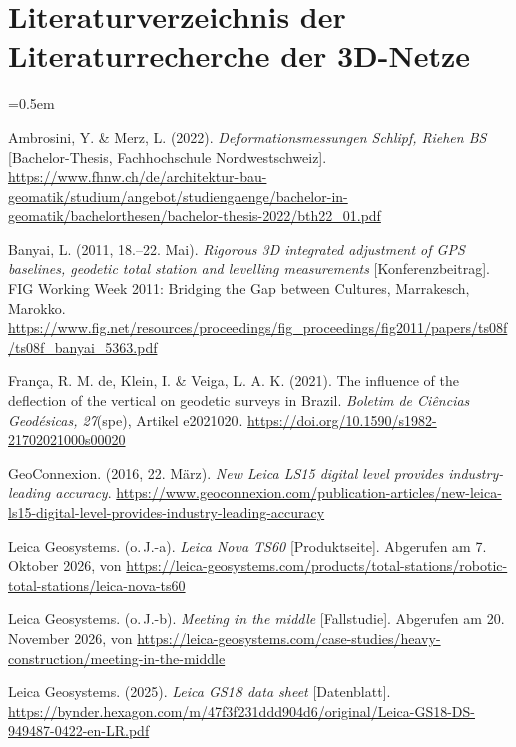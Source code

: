 \section{Literaturverzeichnis der Literaturrecherche der 3D-Netze}
\label{Literaturverzeichnis der Literaturrecherche}

\begin{list}{}{\leftmargin=1.27cm \itemindent=-1.27cm \itemsep=0.5em}

\item Ambrosini, Y. \& Merz, L. (2022). \textit{Deformationsmessungen Schlipf, Riehen BS} [Bachelor-Thesis, Fachhochschule Nordwestschweiz]. \url{https://www.fhnw.ch/de/architektur-bau-geomatik/studium/angebot/studiengaenge/bachelor-in-geomatik/bachelorthesen/bachelor-thesis-2022/bth22_01.pdf}

\item Banyai, L. (2011, 18.--22. Mai). \textit{Rigorous 3D integrated adjustment of GPS baselines, geodetic total station and levelling measurements} [Konferenzbeitrag]. FIG Working Week 2011: Bridging the Gap between Cultures, Marrakesch, Marokko. \url{https://www.fig.net/resources/proceedings/fig_proceedings/fig2011/papers/ts08f/ts08f_banyai_5363.pdf}

\item França, R. M. de, Klein, I. \& Veiga, L. A. K. (2021). The influence of the deflection of the vertical on geodetic surveys in Brazil. \textit{Boletim de Ciências Geodésicas, 27}(spe), Artikel e2021020. \url{https://doi.org/10.1590/s1982-21702021000s00020}

\item GeoConnexion. (2016, 22. März). \textit{New Leica LS15 digital level provides industry-leading accuracy}. \url{https://www.geoconnexion.com/publication-articles/new-leica-ls15-digital-level-provides-industry-leading-accuracy}

\item Leica Geosystems. (o.\,J.-a). \textit{Leica Nova TS60} [Produktseite]. Abgerufen am 7. Oktober 2026, von \url{https://leica-geosystems.com/products/total-stations/robotic-total-stations/leica-nova-ts60}

\item Leica Geosystems. (o.\,J.-b). \textit{Meeting in the middle} [Fallstudie]. Abgerufen am 20. November 2026, von \url{https://leica-geosystems.com/case-studies/heavy-construction/meeting-in-the-middle}

\item Leica Geosystems. (2025). \textit{Leica GS18 data sheet} [Datenblatt]. \url{https://bynder.hexagon.com/m/47f3f231ddd904d6/original/Leica-GS18-DS-949487-0422-en-LR.pdf}


\end{list}
